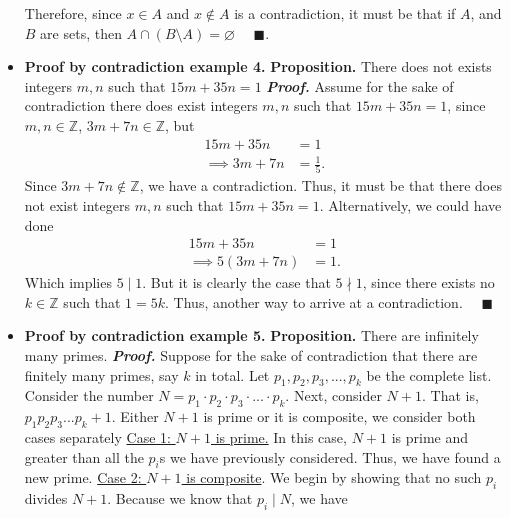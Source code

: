 \documentclass{report}
\begin{document}
\begin{itemize}
{            }
            Therefore, since $x \in A $ and $x \not\in A$ is a contradiction, it must be that if $A$, and $B$ are sets, then $A \cap (B \setminus A) = \varnothing $ $\quad \blacksquare $.
        \item \textbf{Proof by contradiction example 4.}
            \bigbreak \noindent 
            \textbf{Proposition.} There does not exists integers $m,n$ such that $15m + 35n = 1 $
            \bigbreak \noindent 
            \textbf{\textit{Proof.}} Assume for the sake of contradiction there does exist integers $m,n $ such that $15m + 35n = 1$, since $m,n \in \mathbb{Z}$, $3m + 7n \in \mathbb{Z} $, but
            \begin{align*}
                15m + 35n &=  1\\
                \implies 3m + 7n &= \frac{1}{5}
            .\end{align*}
            Since $3m+7n \not\in \mathbb{Z} $, we have a contradiction. Thus, it must be that there does not exist integers $m,n$ such that $15m + 35n = 1$.
            \bigbreak \noindent 
            Alternatively, we could have done
            \begin{align*}
                15m + 35n &= 1 \\
                \implies 5(3m + 7n) &= 1
            .\end{align*}
            Which implies $5\mid 1$. But it is clearly the case that $5\nmid 1$, since there exists no $k\in \mathbb{Z}$ such that $1 = 5k$. Thus, another way to arrive at a contradiction. $\quad \blacksquare $
        \item \textbf{Proof by contradiction example 5.}
            \bigbreak \noindent 
            \textbf{Proposition.} There are infinitely many primes.
            \bigbreak \noindent 
            \textbf{\textit{Proof.}} Suppose for the sake of contradiction that there are finitely many primes, say $k$ in total. Let $p_{1}, p_{2},p_{3},...,p_{k}$ be the complete list. Consider the number $N = p_{1} \cdot p_{2} \cdot p_{3} \cdot ...\cdot p_{k}$. Next, consider $N + 1 $. That is, $p_{1}p_{2}p_{3}...p_{k} + 1$. Either $N + 1 $ is prime or it is composite, we consider both cases separately
            \bigbreak \noindent 
            \underline{Case 1: $N+1$ is prime.} In this case, $N+1$ is prime and greater than all the $p_{i}$s we have previously considered. Thus, we have found a new prime.
            \bigbreak \noindent 
            \underline{Case 2: $N+1$ is composite}. We begin by showing that no such $p_{i}$ divides $N+ 1$. Because we know that $p_{i} \mid N$, we have

\end{itemize}
\end{document}
